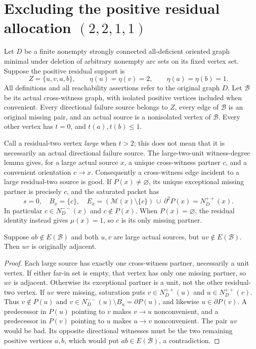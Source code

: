 \section{Excluding the positive residual allocation $(2,2,1,1)$}
\label{sec:exclude-two-two-one-one}

Let $D$ be a finite nonempty strongly connected all-deficient oriented
graph minimal under deletion of arbitrary nonempty arc sets on its
fixed vertex set. Suppose the positive residual support is
\[
 Z=\{u,v,a,b\},\qquad
 \eta(u)=\eta(v)=2,\qquad \eta(a)=\eta(b)=1.
\]
All definitions and all reachability assertions refer to the original
graph $D$. Let $\mathcal B$ be its actual cross-witness graph, with
isolated positive vertices included when convenient. Every directional
failure source belongs to $Z$, every edge of $\mathcal B$ is an
original missing pair, and an actual source is a nonisolated vertex
of $\mathcal B$. Every other vertex has $t=0$, and $t(a),t(b)\le1$.

Call a residual-two vertex \emph{large} when $t>2$; this does not
mean that it is necessarily an actual directional failure source.
The large-two-unit witness-degree lemma gives, for a large actual
source $x$, a unique cross-witness partner $c$, and a convenient
orientation $c\to x$. Consequently a cross-witness edge incident
to a large residual-two source is good. If $P(x)\ne\varnothing$,
its unique exceptional missing partner is precisely $c$, and
the saturated packet has
\[
 s=0,\quad B_x=\{c\},\quad
 E_x=(\mathcal M(x)\setminus\{c\})\,\dot\cup\,
          \partial^2P(x)=N_D^{++}(x).
 \tag{2211-1}\label{eq:2211-large-packet}
\]
In particular $c\in N_D^{--}(x)$ and $c\notin P(x)$.
When $P(x)=\varnothing$, the residual identity instead gives
$\mu(x)=1$, so $c$ is its only missing partner.

\begin{lemma}
\label{lem:2211-large-active-adjacency}
Suppose $ab\notin E(\mathcal B)$ and both $u,v$ are large actual
sources, but $uv\notin E(\mathcal B)$. Then $uv$ is originally adjacent.
\end{lemma}
\begin{proof}
Each large source has exactly one cross-witness partner, necessarily
a unit vertex. If either far-in set is empty, that vertex has only
one missing partner, so $uv$ is adjacent. Otherwise its exceptional
partner is a unit, not the other residual-two vertex.
If $uv$ were missing, saturation puts
$v\in N_D^{++}(u)$ and $u\in N_D^{++}(v)$.
Thus $v\notin P(u)$ and
$v\in N_D^{--}(u)\setminus B_u=\partial P(u)$, and likewise
$u\in\partial P(v)$. A predecessor in $P(u)$ pointing to $v$
makes $v\to u$ nonconvenient, and a predecessor in $P(v)$
pointing to $u$ makes $u\to v$ nonconvenient. The pair $uv$
would be bad. Its opposite directional witnesses must be the two
remaining positive vertices $a,b$, which would put
$ab\in E(\mathcal B)$, a contradiction.
\end{proof}

